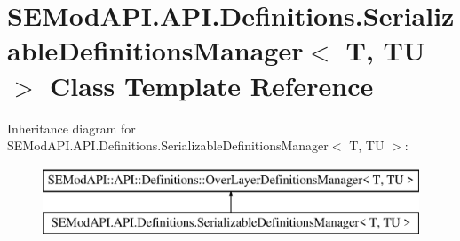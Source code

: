 \hypertarget{class_s_e_mod_a_p_i_1_1_a_p_i_1_1_definitions_1_1_serializable_definitions_manager}{}\section{S\+E\+Mod\+A\+P\+I.\+A\+P\+I.\+Definitions.\+Serializable\+Definitions\+Manager$<$ T, T\+U $>$ Class Template Reference}
\label{class_s_e_mod_a_p_i_1_1_a_p_i_1_1_definitions_1_1_serializable_definitions_manager}
Inheritance diagram for S\+E\+Mod\+A\+P\+I.\+A\+P\+I.\+Definitions.\+Serializable\+Definitions\+Manager$<$ T, T\+U $>$\+:\begin{figure}[H]
\begin{center}
\leavevmode
\includegraphics[height=2.000000cm]{class_s_e_mod_a_p_i_1_1_a_p_i_1_1_definitions_1_1_serializable_definitions_manager}
\end{center}
\end{figure}
